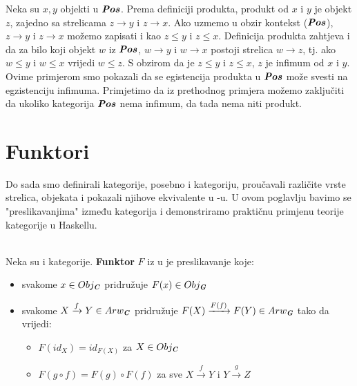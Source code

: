   \begin{example}
    \label{pos:infimum}
    Neka su $x, y$ objekti u $\textbf{\emph{Pos}}$. Prema definiciji produkta, produkt od $x$ i $y$ je objekt $z$, zajedno sa strelicama
    $z \to y$ i $z \to x$. Ako uzmemo u obzir kontekst ($\textbf{\emph{Pos}}$), $z \to y$ i $z \to x$ možemo zapisati i kao $z \leq y$ i $z \leq x$.
    Definicija produkta zahtjeva i da za bilo koji objekt $w$ iz $\textbf{\emph{Pos}}$, $w \to y$ i $w \to x$ postoji strelica $w \to z$, tj.
    ako $w \leq y$ i $w \leq x$ vrijedi $w \leq z$. S obzirom da je $z \leq y$ i $z \leq x$, $z$ je infimum od $x$ i $y$.
    Ovime primjerom smo pokazali da se egistencija produkta u $\textbf{\emph{Pos}}$ može svesti na egzistenciju infimuma.
    Primjetimo da iz prethodnog primjera možemo zaključiti da ukoliko kategorija $\textbf{\emph{Pos}}$ nema infimum, da tada nema niti produkt. 
  \end{example}
  \newpage

  \section{Funktori}
  Do sada smo definirali kategorije, posebno i  kategoriju,
  proučavali različite vrste strelica, objekata i pokazali njihove ekvivalente
  u -u. U ovom poglavlju bavimo se "preslikavanjima" između
  kategorija i demonstriramo praktičnu primjenu teorije kategorije u Haskellu.
  
  \begin{definition}\ \\
  
    \noindent Neka su  i  kategorije. \textbf{Funktor} $F$ iz
     u  je preslikavanje koje:
    \begin{itemize}
      \item svakome $x \in Obj_{\textbf{\emph{C}}}$ pridružuje $F(x) \in
        Obj_{\textbf{\emph{G}}}$
      \item svakome $X \xrightarrow{f} Y \in Arw_{\textbf{\emph{C}}}$ pridružuje
        $F(X) \xrightarrow{F(f)} F(Y) \in Arw_{\textbf{\emph{G}}}$ tako da vrijedi:
        \begin{itemize}
          \item $F(id_X) = id_{F(X)}$ za $X \in Obj_{\textbf{\emph{C}}}$
          \item $F(g \circ f) = F(g) \circ F(f)$ za sve $X \xrightarrow{f} Y$ i
            $Y \xrightarrow{g} Z$
        \end{itemize}
    \end{itemize}
  \end{definition}
  
